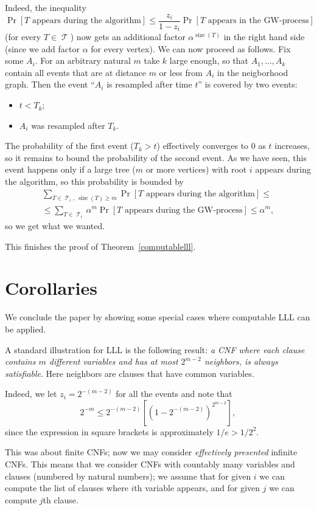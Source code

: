 \documentclass[12pt]{article}
\DeclareMathOperator{\Tr}{\mathcal{T}}
\DeclareMathOperator{\size}{\mathrm{size}}
\begin{document}
Indeed, the inequality
$$
\Pr[\text{$T$ appears during the algorithm}]\le\frac{z_i}{1-z_i}\Pr[\text{$T$ appears in the GW-process}]
    $$
 (for every $T\in\Tr$) now gets an additional factor $\alpha^{\size(T)}$ in the right hand side (since we add factor $\alpha$ for every vertex). We can now proceed as follows. Fix some $A_i$. For an arbitrary natural $m$ take $k$ large enough, so that $A_1,\ldots,A_k$ contain all events that are at distance $m$ or less from $A_i$ in the neigborhood graph. Then the event ``$A_i$ is resampled after time $t$'' is covered by two events:

\begin{itemize}
\item $t<T_k$;
\item $A_i$ was resampled after $T_k$.
\end{itemize}

The probability of the first event ($T_k>t$) effectively converges to $0$ as $t$ increases, so it remains to bound the probability of the second event. As we have seen, this event happens only if a large tree ($m$ or more vertices) with root $i$ appears during the algorithm, so this probability is bounded by
 \begin{multline*}
 \sum_{T\in\Tr_i,\ \size(T)\ge m} \Pr[\text{$T$ appears during the algorithm}]\le\\
\le \sum_{T\in\Tr_i} \alpha^m \Pr[\text{$T$ appears during the GW-process}]\le \alpha^m,
\end{multline*}
so we get what we wanted.

\medskip
This finishes the proof of Theorem~\ref{computablelll}.

\section{Corollaries}

We conclude the paper by showing some special cases where computable LLL can be applied.

A standard illustration for LLL is the following result:
\emph{a CNF where each clause contains $m$ different variables and
has at most $2^{m-2}$ neighbors, is always satisfiable}.
Here neighbors are clauses that have common variables.

Indeed, we let $z_i=2^{-(m-2)}$ for all the events and note that
  $$
2^{-m} \le 2^{-(m-2)} [(1-2^{-(m-2)})^{2^{m-2}}],
  $$
since the expression in square brackets is approximately $1/e>1/2^2$.

This was about finite CNFs; now we may consider \emph{effectively presented} infinite CNFs. This means that we consider CNFs with countably many variables and clauses (numbered by natural numbers); we assume that for given $i$ we
can compute the list of clauses where $i$th variable appears, and for given
$j$ we can compute $j$th clause.
\end{document}
